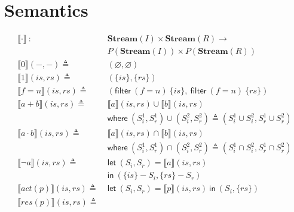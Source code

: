 \documentclass[12pt, letterpaper]{article}
\let\emptyset\varnothing
\newcommand\interp[1]{\llbracket #1 \rrbracket}
\begin{document}
\newpage
\section{Semantics}
  \begin{align*}
    \interp{ \cdot }\ 
      :\ \ &
      \mathbf{Stream}(I)\times \mathbf{Stream}(R) \rightarrow \\
      & P(\mathbf{Stream}(I))\times P(\mathbf{Stream}(R)) 
      \\
    \interp{ 0 }(-, -)
      \triangleq\ &
      (\emptyset , \emptyset)
      \\ %
    \interp{ 1 }(\mathit{is}, \mathit{rs})
      \triangleq\ &
      (\{\mathit{is}\},\{\mathit{rs}\})
      \\
    \interp{ f=n }(\mathit{is}, \mathit{rs})
      \triangleq\ &
      (\mathsf{filter}\ (f=n)\ \{\mathit{is}\},\
       \mathsf{filter}\ (f=n)\ \{\mathit{rs}\}) 
      \\
    \interp{ a + b }(\mathit{is}, \mathit{rs})
      \triangleq\ &
      \interp { a }(\mathit{is}, \mathit{rs})\cup
      \interp { b }(\mathit{is}, \mathit{rs}) \\
      &\mathsf{where}\ (S_i^1, S_r^1)\cup (S_i^2, S_r^2)\triangleq
        (S_i^1\cup S_i^2, S_r^1\cup S_r^2)\\
    \interp { a \cdot b }(\mathit{is}, \mathit{rs})
      \triangleq\ &
      \interp { a }(\mathit{is}, \mathit{rs})\cap
      \interp { b }(\mathit{is}, \mathit{rs}) \\
      &\mathsf{where}\ (S_i^1, S_r^1)\cap (S_i^2, S_r^2)\triangleq
        (S_i^1\cap S_i^2, S_r^1\cap S_r^2)\\
    \interp { \neg a }(\mathit{is}, \mathit{rs})
      \triangleq\ &
      \mathsf{let}\ (S_i, S_r) = \interp {a}(\mathit{is}, \mathit{rs}) \\
      &\mathsf{in}\ (\{\mathit{is}\} - S_i, \{\mathit{rs}\} - S_r)
      \\
    \interp { act(p) }(\mathit{is}, \mathit{rs})
      \triangleq\ &
      \mathsf{let}\ (S_i,S_r) = \interp {p}(\mathit{is}, \mathit{rs})\ 
      \mathsf{in}\ (S_i, \{\mathit{rs}\})
      \\
    \interp { res(p) }(\mathit{is}, \mathit{rs})
      \triangleq\ &

\end{align*}
\end{document}
